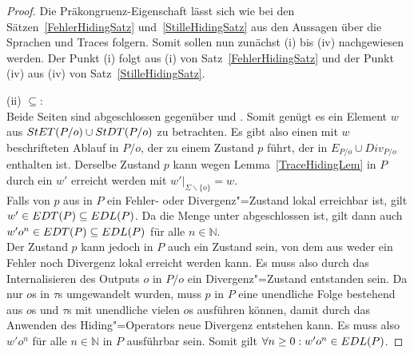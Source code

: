 \begin{proof}
  Die Präkongruenz-Eigenschaft lässt sich wie bei den
  Sätzen~\ref{FehlerHidingSatz} und~\ref{StilleHidingSatz} aus den Aussagen
  über die Sprachen und Traces folgern. Somit sollen nun zunächst (i) bis (iv)
  nachgewiesen werden. Der Punkt (i) folgt aus (i) von
  Satz~\ref{FehlerHidingSatz} und der Punkt (iv) aus (iv) von
  Satz~\ref{StilleHidingSatz}.

  (ii) \glqq $\subseteq$\grqq{}:\\
  Beide Seiten sind abgeschlossen gegenüber \prune{} und \cont{}. Somit genügt
  es ein Element $w$ aus $StET (P/o)\cup StDT (P/o)$ zu betrachten. Es gibt
  also einen mit $w$ beschrifteten Ablauf in $P/o$, der zu einem Zustand $p$
  führt, der in $E_{P/o}\cup Div_{P/o}$ enthalten ist. Derselbe Zustand $p$
  kann wegen Lemma~\ref{TraceHidingLem} in $P$ durch ein $w'$ erreicht werden
  mit $w'|_{\Sigma\backslash\{o\}} = w$.\\
  Falls von $p$ aus in $P$ ein Fehler- oder Divergenz"=Zustand lokal erreichbar
  ist, gilt $w'\in EDT (P)\subseteq EDL (P)$. Da die Menge \EDL{} unter
  \cont{} abgeschlossen ist, gilt dann auch $w'o^n\in EDT (P)\subseteq EDL (P)$
  für alle $n\in\mathbb{N}$.\\
  Der Zustand $p$ kann jedoch in $P$ auch ein Zustand sein, von dem aus weder
  ein Fehler noch Divergenz lokal erreicht werden kann. Es muss also durch das
  Internalisieren des Outputs $o$ in $P/o$ ein Divergenz"=Zustand entstanden
  sein. Da nur $o$s in $\tau$s umgewandelt wurden, muss $p$ in $P$ eine
  unendliche Folge bestehend aus $o$s und $\tau$s mit unendliche vielen $o$s
  ausführen können, damit durch das Anwenden des Hiding"=Operators neue
  Divergenz entstehen kann. Es muss also $w'o^n$ für alle $n\in\mathbb{N}$ in
  $P$ ausführbar sein. Somit gilt $\forall n\geq 0: w'o^n\in EDL (P)$.


\end{proof}
